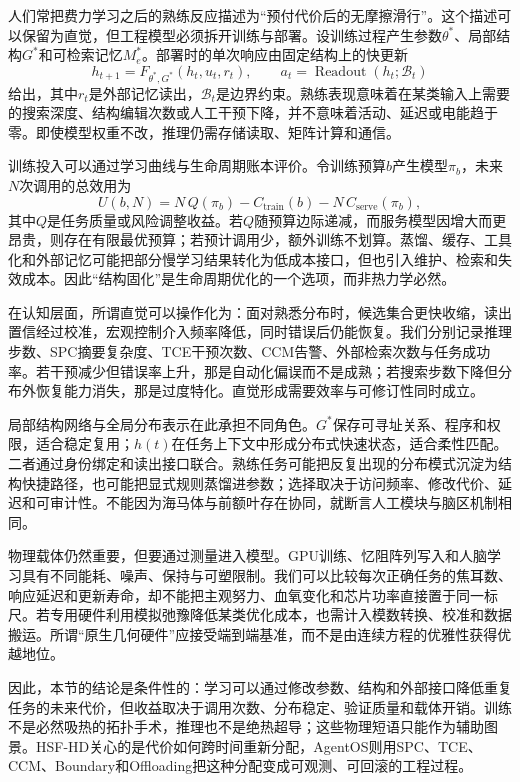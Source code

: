 人们常把费力学习之后的熟练反应描述为“预付代价后的无摩擦滑行”。这个描述可以保留为直觉，但工程模型必须拆开训练与部署。设训练过程产生参数$\theta^*$、局部结构$G^*$和可检索记忆$M_e^*$。部署时的单次响应由固定结构上的快更新
\begin{equation}
h_{t+1}=F_{\theta^*,G^*}(h_t,u_t,r_t),\qquad
a_t=\operatorname{Readout}(h_t;\mathcal B_t)
\end{equation}
给出，其中$r_t$是外部记忆读出，$\mathcal B_t$是边界约束。熟练表现意味着在某类输入上需要的搜索深度、结构编辑次数或人工干预下降，并不意味着活动、延迟或电能趋于零。即使模型权重不改，推理仍需存储读取、矩阵计算和通信。

训练投入可以通过学习曲线与生命周期账本评价。令训练预算$b$产生模型$\pi_b$，未来$N$次调用的总效用为
\begin{equation}
U(b,N)=N\,Q(\pi_b)-C_{\mathrm{train}}(b)-N\,C_{\mathrm{serve}}(\pi_b),
\end{equation}
其中$Q$是任务质量或风险调整收益。若$Q$随预算边际递减，而服务模型因增大而更昂贵，则存在有限最优预算；若预计调用少，额外训练不划算。蒸馏、缓存、工具化和外部记忆可能把部分慢学习结果转化为低成本接口，但也引入维护、检索和失效成本。因此“结构固化”是生命周期优化的一个选项，而非热力学必然。

在认知层面，所谓直觉可以操作化为：面对熟悉分布时，候选集合更快收缩，读出置信经过校准，宏观控制介入频率降低，同时错误后仍能恢复。我们分别记录推理步数、SPC摘要复杂度、TCE干预次数、CCM告警、外部检索次数与任务成功率。若干预减少但错误率上升，那是自动化偏误而不是成熟；若搜索步数下降但分布外恢复能力消失，那是过度特化。直觉形成需要效率与可修订性同时成立。

局部结构网络与全局分布表示在此承担不同角色。$G^*$保存可寻址关系、程序和权限，适合稳定复用；$h(t)$在任务上下文中形成分布式快速状态，适合柔性匹配。二者通过身份绑定和读出接口联合。熟练任务可能把反复出现的分布模式沉淀为结构快捷路径，也可能把显式规则蒸馏进参数；选择取决于访问频率、修改代价、延迟和可审计性。不能因为海马体与前额叶存在协同，就断言人工模块与脑区机制相同。

物理载体仍然重要，但要通过测量进入模型。GPU训练、忆阻阵列写入和人脑学习具有不同能耗、噪声、保持与可塑限制。我们可以比较每次正确任务的焦耳数、响应延迟和更新寿命，却不能把主观努力、血氧变化和芯片功率直接置于同一标尺。若专用硬件利用模拟弛豫降低某类优化成本，也需计入模数转换、校准和数据搬运。所谓“原生几何硬件”应接受端到端基准，而不是由连续方程的优雅性获得优越地位。

因此，本节的结论是条件性的：学习可以通过修改参数、结构和外部接口降低重复任务的未来代价，但收益取决于调用次数、分布稳定、验证质量和载体开销。训练不是必然吸热的拓扑手术，推理也不是绝热超导；这些物理短语只能作为辅助图景。HSF-HD关心的是代价如何跨时间重新分配，AgentOS则用SPC、TCE、CCM、Boundary和Offloading把这种分配变成可观测、可回滚的工程过程。

